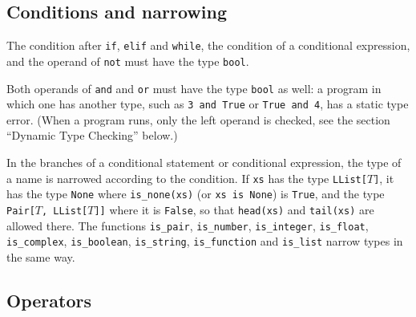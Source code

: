\subsection*{Conditions and narrowing}

The condition after \texttt{if}, \texttt{elif} and \texttt{while}, the condition of a
conditional expression, and the operand of \texttt{not} must have the type \texttt{bool}.

Both operands of \texttt{and} and \texttt{or} must have the type \texttt{bool} as well: a program
in which one has another type, such as \texttt{3~and~True} or \texttt{True~and~4}, has a static type
error. (When a program runs, only the left operand is checked, see the section ``Dynamic Type
Checking'' below.)

In the branches of a conditional statement or conditional expression, the type of a name is
narrowed according to the condition. If \texttt{xs} has the type \texttt{LList[}$T$\texttt{]},
it has the type \texttt{None} where \texttt{is\_none(xs)} (or \texttt{xs is None}) is
\texttt{True}, and the type \texttt{Pair[}$T$\texttt{,~LList[}$T$\texttt{]]} where it is
\texttt{False}, so that \texttt{head(xs)} and \texttt{tail(xs)} are allowed there. The
functions \texttt{is\_pair}, \texttt{is\_number}, \texttt{is\_integer}, \texttt{is\_float},
\texttt{is\_complex}, \texttt{is\_boolean}, \texttt{is\_string}, \texttt{is\_function} and
\texttt{is\_list} narrow types in the same way.

\subsection*{Operators}

